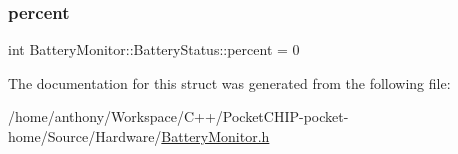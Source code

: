\subsubsection{\texorpdfstring{percent}{percent}}
{\footnotesize\ttfamily int Battery\+Monitor\+::\+Battery\+Status\+::percent = 0}



The documentation for this struct was generated from the following file\+:\begin{DoxyCompactItemize}
\item 
/home/anthony/\+Workspace/\+C++/\+Pocket\+C\+H\+I\+P-\/pocket-\/home/\+Source/\+Hardware/\mbox{\hyperlink{BatteryMonitor_8h}{Battery\+Monitor.\+h}}\end{DoxyCompactItemize}
